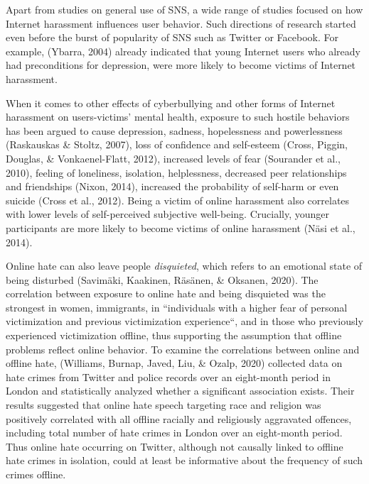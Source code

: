 \documentclass[10pt,dvipsnames]{scrartcl}
\begin{document}
Apart from studies on general use of SNS, a wide range of studies
focused on how Internet harassment influences user behavior. Such
directions of research started even before the burst of popularity of
SNS such as Twitter or Facebook. For example, (Ybarra, 2004) already
indicated that young Internet users who already had preconditions for
depression, were more likely to become victims of Internet harassment.

When it comes to other effects of cyberbullying and other forms of
Internet harassment on users-victims' mental health, exposure to such
hostile behaviors has been argued to cause depression, sadness,
hopelessness and powerlessness (Raskauskas \& Stoltz, 2007), loss of
confidence and self-esteem (Cross, Piggin, Douglas, \& Vonkaenel-Flatt,
2012), increased levels of fear (Sourander et al., 2010), feeling of
loneliness, isolation, helplessness, decreased peer relationships and
friendships (Nixon, 2014), increased the probability of self-harm or
even suicide (Cross et al., 2012). Being a victim of online harassment
also correlates with lower levels of self-perceived subjective
well-being. Crucially, younger participants are more likely to become
victims of online harassment (Näsi et al., 2014).

Online hate can also leave people \textit{disquieted}, which refers to
an emotional state of being disturbed (Savimäki, Kaakinen, Räsänen, \&
Oksanen, 2020). The correlation between exposure to online hate and
being disquieted was the strongest in women, immigrants, in
``individuals with a higher fear of personal victimization and previous
victimization experience``, and in those who previously experienced
victimization offline, thus supporting the assumption that offline
problems reflect online behavior. To examine the correlations between
online and offline hate, (Williams, Burnap, Javed, Liu, \& Ozalp, 2020)
collected data on hate crimes from Twitter and police records over an
eight-month period in London and statistically analyzed whether a
significant association exists. Their results suggested that online hate
speech targeting race and religion was positively correlated with all
offline racially and religiously aggravated offences, including total
number of hate crimes in London over an eight-month period. Thus online
hate occurring on Twitter, although not causally linked to offline hate
crimes in isolation, could at least be informative about the frequency
of such crimes offline.
\end{document}
